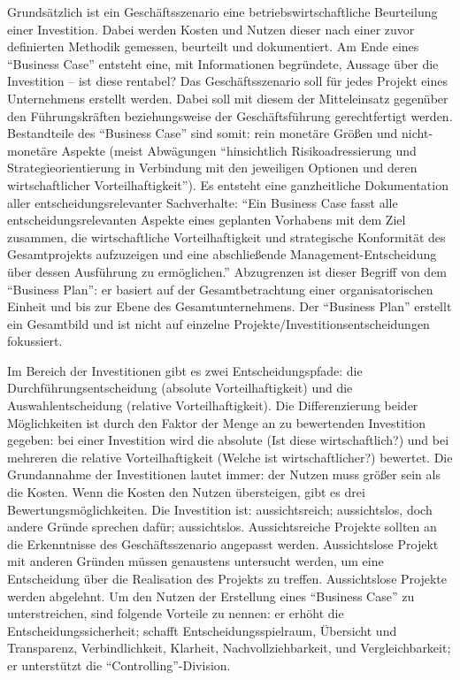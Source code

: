 Grundsätzlich ist ein Geschäftsszenario eine betriebswirtschaftliche Beurteilung einer Investition. Dabei werden Kosten und Nutzen dieser nach einer zuvor definierten Methodik gemessen, beurteilt und dokumentiert. Am Ende eines \enquote{Business Case} entsteht eine, mit Informationen begründete, Aussage über die Investition -- ist diese rentabel? Das Geschäftsszenario soll für jedes Projekt eines Unternehmens erstellt werden. Dabei soll mit diesem der Mitteleinsatz gegenüber den Führungskräften beziehungsweise der Geschäftsführung gerechtfertigt werden. Bestandteile des \enquote{Business Case} sind somit: rein monetäre Größen und nicht-monetäre Aspekte (meist Abwägungen \enquote{hinsichtlich Risikoadressierung und Strategieorientierung in Verbindung mit den jeweiligen Optionen und deren wirtschaftlicher Vorteilhaftigkeit}\autocite[][S.\,12]{brugger_it_2009}). Es entsteht eine ganzheitliche Dokumentation aller entscheidungsrelevanter Sachverhalte: \enquote{Ein Business Case fasst alle entscheidungsrelevanten Aspekte eines geplanten Vorhabens mit dem Ziel zusammen, die wirtschaftliche Vorteilhaftigkeit und strategische Konformität des Gesamtprojekts aufzuzeigen und eine abschließende Management-Entscheidung über dessen Ausführung zu ermöglichen.}\autocite[][S.\,13]{brugger_it_2009} Abzugrenzen ist dieser Begriff von dem \enquote{Business Plan}: er basiert auf der Gesamtbetrachtung einer organisatorischen Einheit und bis zur Ebene des Gesamtunternehmens. Der \enquote{Business Plan} erstellt ein Gesamtbild und ist nicht auf einzelne Projekte/Investitionsentscheidungen fokussiert. 
\par
Im Bereich der Investitionen gibt es zwei Entscheidungspfade: die Durchführungsentscheidung (absolute Vorteilhaftigkeit) und die Auswahlentscheidung (relative Vorteilhaftigkeit).\autocite[vgl.][S.\,14]{brugger_it_2009} Die Differenzierung beider Möglichkeiten ist durch den Faktor der Menge an zu bewertenden Investition gegeben: bei einer Investition wird die absolute (Ist diese wirtschaftlich?) und bei mehreren die relative Vorteilhaftigkeit (Welche ist wirtschaftlicher?) bewertet. Die Grundannahme der Investitionen lautet immer: der Nutzen muss größer sein als die Kosten. Wenn die Kosten den Nutzen übersteigen, gibt es drei Bewertungsmöglichkeiten. Die Investition ist: aussichtsreich; aussichtslos, doch andere Gründe sprechen dafür; aussichtslos. Aussichtsreiche Projekte sollten an die Erkenntnisse des Geschäftsszenario angepasst werden. Aussichtslose Projekt mit anderen Gründen müssen genaustens untersucht werden, um eine Entscheidung über die Realisation des Projekts zu treffen. Aussichtslose Projekte werden abgelehnt. Um den Nutzen der Erstellung eines \enquote{Business Case} zu unterstreichen, sind folgende Vorteile zu nennen: er erhöht die Entscheidungssicherheit; schafft Entscheidungsspielraum, Übersicht und Transparenz, Verbindlichkeit, Klarheit, Nachvollziehbarkeit, und Vergleichbarkeit; er unterstützt die \enquote{Controlling}-Division.\autocite[vgl.][S.\,17]{brugger_it_2009} \par
